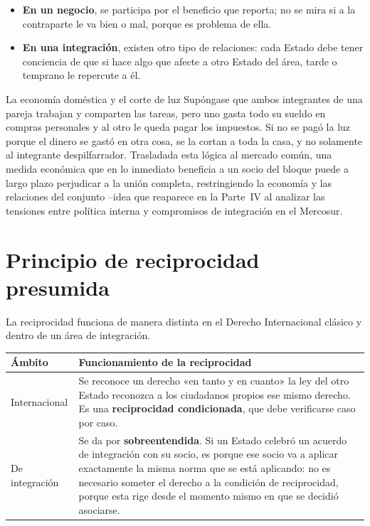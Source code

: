 \documentclass[12pt,oneside]{book}
\begin{document}
\begin{itemize}
    \item \textbf{En un negocio}, se participa por el beneficio que reporta; no se mira si a la contraparte le va bien o mal, porque es problema de ella.
    \item \textbf{En una integración}, existen otro tipo de relaciones: cada Estado debe tener conciencia de que si hace algo que afecte a otro Estado del área, tarde o temprano le repercute a él.
\end{itemize}

\begin{ejemplo}{La economía doméstica y el corte de luz}
Supóngase que ambos integrantes de una pareja trabajan y comparten las tareas, pero uno gasta todo su sueldo en compras personales y al otro le queda pagar los impuestos. Si no se pagó la luz porque el dinero se gastó en otra cosa, se la cortan a toda la casa, y no solamente al integrante despilfarrador. Trasladada esta lógica al mercado común, una medida económica que en lo inmediato beneficia a un socio del bloque puede a largo plazo perjudicar a la unión completa, restringiendo la economía y las relaciones del conjunto --idea que reaparece en la Parte~IV al analizar las tensiones entre política interna y compromisos de integración en el Mercosur.
\end{ejemplo}

\section{Principio de reciprocidad presumida}

La reciprocidad funciona de manera distinta en el Derecho Internacional clásico y dentro de un área de integración.

\begin{table}[H]
\centering
\small
\renewcommand{\arraystretch}{1.3}
\begin{tabularx}{\textwidth}{>{\raggedright\arraybackslash}p{}>{\raggedright\arraybackslash}X}
\toprule
\textbf{Ámbito} & \textbf{Funcionamiento de la reciprocidad} \\
\midrule
Internacional & Se reconoce un derecho «en tanto y en cuanto» la ley del otro Estado reconozca a los ciudadanos propios ese mismo derecho. Es una \textbf{reciprocidad condicionada}, que debe verificarse caso por caso. \\
\addlinespace
De integración & Se da por \textbf{sobreentendida}. Si un Estado celebró un acuerdo de integración con su socio, es porque ese socio va a aplicar exactamente la misma norma que se está aplicando: no es necesario someter el derecho a la condición de reciprocidad, porque esta rige desde el momento mismo en que se decidió asociarse. \\
\bottomrule
\end{tabularx}
\end{table}
\end{document}
